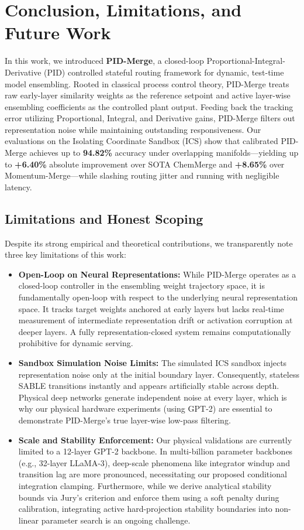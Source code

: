 \section{Conclusion, Limitations, and Future Work}
\label{sec:conclusion}

In this work, we introduced \textbf{PID-Merge}, a closed-loop Proportional-Integral-Derivative (PID) controlled stateful routing framework for dynamic, test-time model ensembling. Rooted in classical process control theory, PID-Merge treats raw early-layer similarity weights as the reference setpoint and active layer-wise ensembling coefficients as the controlled plant output. Feeding back the tracking error utilizing Proportional, Integral, and Derivative gains, PID-Merge filters out representation noise while maintaining outstanding responsiveness. Our evaluations on the Isolating Coordinate Sandbox (ICS) show that calibrated PID-Merge achieves up to \textbf{94.82\%} accuracy under overlapping manifolds—yielding up to \textbf{+6.40\%} absolute improvement over SOTA ChemMerge and \textbf{+8.65\%} over Momentum-Merge—while slashing routing jitter and running with negligible latency.

\subsection{Limitations and Honest Scoping}
Despite its strong empirical and theoretical contributions, we transparently note three key limitations of this work:
\begin{itemize}
    \item \textbf{Open-Loop on Neural Representations:} While PID-Merge operates as a closed-loop controller in the ensembling weight trajectory space, it is fundamentally open-loop with respect to the underlying neural representation space. It tracks target weights anchored at early layers but lacks real-time measurement of intermediate representation drift or activation corruption at deeper layers. A fully representation-closed system remains computationally prohibitive for dynamic serving.
    \item \textbf{Sandbox Simulation Noise Limits:} The simulated ICS sandbox injects representation noise only at the initial boundary layer. Consequently, stateless SABLE transitions instantly and appears artificially stable across depth. Physical deep networks generate independent noise at every layer, which is why our physical hardware experiments (using GPT-2) are essential to demonstrate PID-Merge's true layer-wise low-pass filtering.
    \item \textbf{Scale and Stability Enforcement:} Our physical validations are currently limited to a 12-layer GPT-2 backbone. In multi-billion parameter backbones (e.g., 32-layer LLaMA-3), deep-scale phenomena like integrator windup and transition lag are more pronounced, necessitating our proposed conditional integration clamping. Furthermore, while we derive analytical stability bounds via Jury's criterion and enforce them using a soft penalty during calibration, integrating active hard-projection stability boundaries into non-linear parameter search is an ongoing challenge.
\end{itemize}

